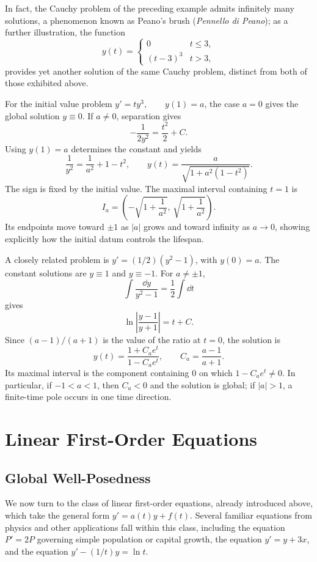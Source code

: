 In fact, the Cauchy problem of the preceding example admits infinitely many solutions, a phenomenon known as Peano's brush (\emph{Pennello di Peano}); as a further illustration, the function
\[
y(t) =
\begin{cases}
0 & t \leq 3, \\
(t-3)^3 & t > 3,
\end{cases}
\]
provides yet another solution of the same Cauchy problem, distinct from both of those exhibited above.

For the initial value problem $y'=ty^3,\qquad y(1)=a$, the case $a=0$ gives the global solution $y\equiv0$. If $a\neq0$,
separation gives
\[
-\frac1{2y^2}=\frac{t^2}{2}+C.
\]
Using $y(1)=a$ determines the constant and yields
\[
\frac1{y^2}=\frac1{a^2}+1-t^2,
\qquad
y(t)=\frac{a}{\sqrt{1+a^2(1-t^2)}}.
\]
The sign is fixed by the initial value. The maximal interval containing
$t=1$ is
\[
I_a=\left(-\sqrt{1+\frac1{a^2}},\,
\sqrt{1+\frac1{a^2}}\right).
\]
Its endpoints move toward $\pm1$ as $|a|$ grows and toward infinity as
$a\to0$, showing explicitly how the initial datum controls the lifespan.

A closely related problem is $y' = (1/2)(y^2 - 1)$, with $y(0)=a$. The constant solutions are $y\equiv1$ and $y\equiv-1$.
For $a\neq\pm1$, \[
\int\frac{\dd y}{y^2-1}=\frac12\int\dd t
\] gives
\[
\ln\left|\frac{y-1}{y+1}\right|=t+C.
\]
Since $(a-1)/(a+1)$ is the value of the ratio at $t=0$, the solution is
\[
y(t)=\frac{1+C_a e^t}{1-C_a e^t},
\qquad
C_a=\frac{a-1}{a+1}.
\]
Its maximal interval is the component containing $0$ on which
$1-C_a e^t\neq0$. In particular, if $-1<a<1$, then $C_a<0$ and the
solution is global; if $|a|>1$, a finite-time pole occurs in one time
direction.



\section{Linear First-Order Equations}

\subsection{Global Well-Posedness}

We now turn to the class of linear first-order equations, already introduced above, which take the general form $y' = a(t) y + f(t)$. Several familiar equations from physics and other applications fall within this class, including the equation $P' = 2P$ governing simple population or capital growth, the equation $y' = y + 3x$, and the equation $y' - (1/t) y = \ln t$.

